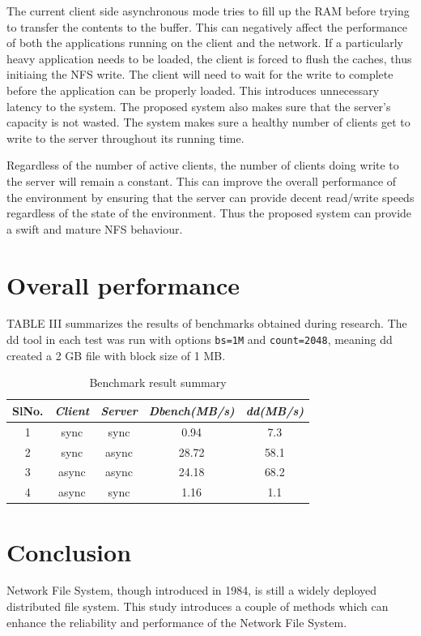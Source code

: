 \documentclass[conference]{IEEEtran}
\begin{document}
The current client side asynchronous mode tries to fill up the RAM before
trying to transfer the contents to the buffer. This can negatively affect
the performance of both the applications running on the client and the
network. If a particularly heavy application needs to be loaded, the client 
is forced to flush the caches, thus initiaing the NFS write. The client
will need to wait for the write to complete before the application can be
properly loaded. This introduces unnecessary latency to the system. The 
proposed system also makes sure that the server's capacity is not wasted.
The system makes sure a healthy number of clients get to write to the server
throughout its running time.

Regardless of the number of active clients, the number of clients doing
write to the server will remain a constant. This can improve the overall 
performance of the environment by ensuring that the server can provide 
decent read/write speeds regardless of the state of the environment. Thus
the proposed system can provide a swift and mature NFS behaviour.
\section{Overall performance}
TABLE III summarizes the results of benchmarks obtained during research. The
dd tool in each test was run with options \texttt{bs=1M} and \texttt{count=2048}, meaning
dd created a 2 GB file with block size of 1 MB.
\begin{table}[htbp]
\caption{Benchmark result summary}
\begin{center}
\begin{tabular}{|c|c|c|c|c|}
\hline
\cline{2-3} 
\textbf{SlNo.} & \textbf{\textit{Client}}& \textbf{\textit{Server}}&\textbf{\textit{Dbench(MB/s)}}&\textbf{\textit{dd(MB/s)}} \\
\hline
1& sync & sync & 0.94  &7.3 \\
2& sync & async & 28.72 &58.1 \\
3& async & async & 24.18 & 68.2  \\
4& async & sync & 1.16  & 1.1  \\
\hline
\end{tabular}
\label{tab1}
\end{center}
\end{table}
\section{Conclusion}
Network File System, though introduced in 1984, is still a widely deployed
distributed file system. This study introduces a couple of methods which can
enhance the reliability and performance of the Network File System.
\end{document}
